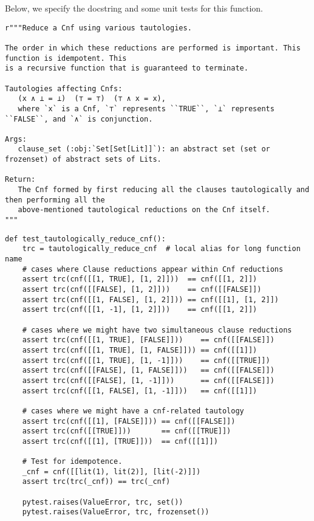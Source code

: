 \documentclass[11pt]{article}
\begin{document}
Below, we specify the docstring and some unit tests for this function.

\begin{verbatim}
r"""Reduce a Cnf using various tautologies.

The order in which these reductions are performed is important. This function is idempotent. This
is a recursive function that is guaranteed to terminate.

Tautologies affecting Cnfs:
   (x ∧ ⊥ = ⊥)  (⊤ = ⊤)  (⊤ ∧ x = x),
   where `x` is a Cnf, `⊤` represents ``TRUE``, `⊥` represents ``FALSE``, and `∧` is conjunction.

Args:
   clause_set (:obj:`Set[Set[Lit]]`): an abstract set (set or frozenset) of abstract sets of Lits.

Return:
   The Cnf formed by first reducing all the clauses tautologically and then performing all the
   above-mentioned tautological reductions on the Cnf itself.
"""
\end{verbatim}

\begin{verbatim}
def test_tautologically_reduce_cnf():
    trc = tautologically_reduce_cnf  # local alias for long function name
    # cases where Clause reductions appear within Cnf reductions
    assert trc(cnf([[1, TRUE], [1, 2]]))  == cnf([[1, 2]])
    assert trc(cnf([[FALSE], [1, 2]]))    == cnf([[FALSE]])
    assert trc(cnf([[1, FALSE], [1, 2]])) == cnf([[1], [1, 2]])
    assert trc(cnf([[1, -1], [1, 2]]))    == cnf([[1, 2]])

    # cases where we might have two simultaneous clause reductions
    assert trc(cnf([[1, TRUE], [FALSE]]))    == cnf([[FALSE]])
    assert trc(cnf([[1, TRUE], [1, FALSE]])) == cnf([[1]])
    assert trc(cnf([[1, TRUE], [1, -1]]))    == cnf([[TRUE]])
    assert trc(cnf([[FALSE], [1, FALSE]]))   == cnf([[FALSE]])
    assert trc(cnf([[FALSE], [1, -1]]))      == cnf([[FALSE]])
    assert trc(cnf([[1, FALSE], [1, -1]]))   == cnf([[1]])

    # cases where we might have a cnf-related tautology
    assert trc(cnf([[1], [FALSE]])) == cnf([[FALSE]])
    assert trc(cnf([[TRUE]]))       == cnf([[TRUE]])
    assert trc(cnf([[1], [TRUE]]))  == cnf([[1]])

    # Test for idempotence.
    _cnf = cnf([[lit(1), lit(2)], [lit(-2)]])
    assert trc(trc(_cnf)) == trc(_cnf)

    pytest.raises(ValueError, trc, set())
    pytest.raises(ValueError, trc, frozenset())
\end{verbatim}
\end{document}
